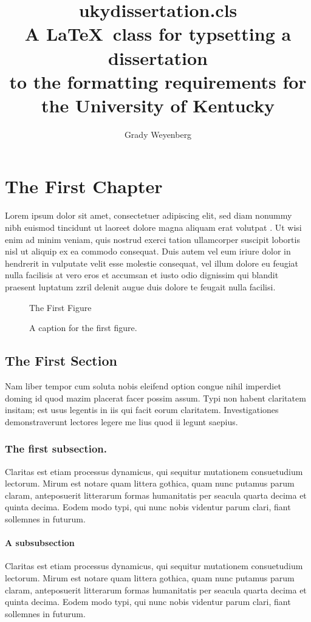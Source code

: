 \documentclass[draft,12pt]{ukydissertation}
\title{ukydissertation.cls\protect\\%
  A \LaTeX\ class for typsetting a dissertation\protect\\%
  to the formatting requirements for\protect\\%
  the University of Kentucky%
}
\author{Grady Weyenberg}
\begin{document}
\makefrontmatter



\chapter{The First Chapter}
\label{cha:first-chapter}
Lorem ipsum dolor sit amet, consectetuer adipiscing elit, sed diam
nonummy nibh euismod tincidunt ut laoreet dolore magna aliquam erat
volutpat \citep{weyenberg2014nonparametric}. Ut wisi enim ad minim veniam, quis nostrud exerci tation
ullamcorper suscipit lobortis nisl ut aliquip ex ea commodo
consequat. Duis autem vel eum iriure dolor in hendrerit in vulputate
velit esse molestie consequat, vel illum dolore eu feugiat nulla
facilisis at vero eros et accumsan et iusto odio dignissim qui blandit
praesent luptatum zzril delenit augue duis dolore te feugait nulla
facilisi.
\begin{figure}
  \centering
  The First Figure
  \caption[A name for the ToC]{A caption for the first figure.}
  \label{fig:numberone}
\end{figure}
\section{The First Section}
\label{sec:first-section}

Nam liber tempor cum soluta nobis eleifend option congue
nihil imperdiet doming id quod mazim placerat facer possim assum. Typi
non habent claritatem insitam; est usus legentis in iis qui facit
eorum claritatem. Investigationes demonstraverunt lectores legere me
lius quod ii legunt saepius.
\subsection{The first subsection.}
\label{sec:first-subsection}

Claritas est etiam processus dynamicus,
qui sequitur mutationem consuetudium lectorum. Mirum est notare quam
littera gothica, quam nunc putamus parum claram, anteposuerit
litterarum formas humanitatis per seacula quarta decima et quinta
decima. Eodem modo typi, qui nunc nobis videntur parum clari, fiant
sollemnes in futurum.

\subsubsection{A subsubsection}

Claritas est etiam processus dynamicus,
qui sequitur mutationem consuetudium lectorum. Mirum est notare quam
littera gothica, quam nunc putamus parum claram, anteposuerit
litterarum formas humanitatis per seacula quarta decima et quinta
decima. Eodem modo typi, qui nunc nobis videntur parum clari, fiant
sollemnes in futurum.
\end{document}
